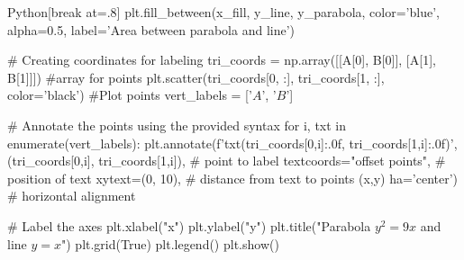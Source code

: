 \documentclass{beamer}
\theoremstyle{remark}
\numberwithin{equation}{section}
\begin{document}
\begin{frame}
\begin{mintedbox}{Python}[break at=.8\textheight]
plt.fill_between(x_fill, y_line, y_parabola, color='blue', alpha=0.5, label='Area between parabola and line')

# Creating coordinates for labeling
tri_coords = np.array([[A[0], B[0]], [A[1], B[1]]])  #array for points
plt.scatter(tri_coords[0, :], tri_coords[1, :], color='black') #Plot points
vert_labels = ['$A$', '$B$']

# Annotate the points using the provided syntax
for i, txt in enumerate(vert_labels):
    plt.annotate(f'{txt}\n({tri_coords[0,i]:.0f}, {tri_coords[1,i]:.0f})',
                 (tri_coords[0,i], tri_coords[1,i]),  # point to label
                 textcoords="offset points",  # position of text
                 xytext=(0, 10),  # distance from text to points (x,y)
                 ha='center')  # horizontal alignment

# Label the axes
plt.xlabel("x")
plt.ylabel("y")
plt.title("Parabola $y^2 = 9x$ and line $y=x$")
plt.grid(True)
plt.legend()
plt.show()
  \end{mintedbox}
\end{frame}


\end{document}

